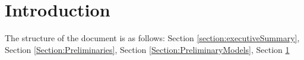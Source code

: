 \section{Introduction}


The structure of the document is as follows: Section \ref{section:executiveSummary}, Section \ref{Section:Preliminaries}, Section \ref{Section:PreliminaryModels}, Section \ref{}